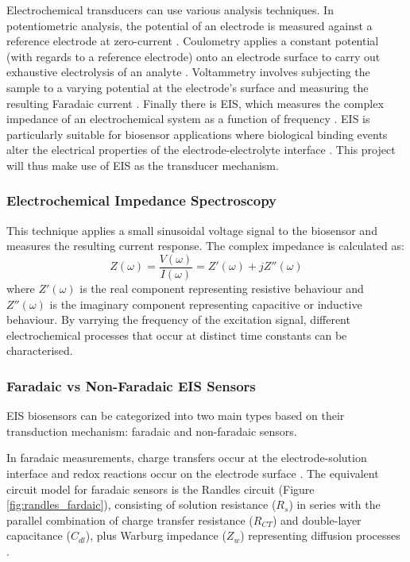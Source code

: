 Electrochemical transducers can use various analysis techniques. In potentiometric analysis, the potential of an electrode is measured against a reference electrode at zero-current \cite{magarElectrochemicalImpedanceSpectroscopy2021}. Coulometry applies a constant potential (with regards to a reference electrode) onto an electrode surface to carry out exhaustive electrolysis of an analyte \cite{magarElectrochemicalImpedanceSpectroscopy2021}. Voltammetry involves subjecting the sample to a varying potential at the electrode's surface and measuring the resulting Faradaic current \cite{magarElectrochemicalImpedanceSpectroscopy2021}. Finally there is \ac{EIS}, which measures the complex impedance of an electrochemical system as a function of frequency \cite{magarElectrochemicalImpedanceSpectroscopy2021}. EIS is particularly suitable for biosensor applications where biological binding events alter the electrical properties of the electrode-electrolyte interface \cite{danielsLabelFreeImpedanceBiosensors2007}. This project will thus make use of EIS as the transducer mechanism.

\subsubsection{Electrochemical Impedance Spectroscopy}
This technique applies a small sinusoidal voltage signal to the biosensor and measures the resulting current response. The complex impedance is calculated as:
\begin{equation}
    Z(\omega) = \frac{V(\omega)}{I(\omega)} = Z'(\omega) + jZ''(\omega)
\end{equation}
where $Z'(\omega)$ is the real component representing resistive behaviour and $Z''(\omega)$ is the imaginary component representing capacitive or inductive behaviour.\cite{orazemTutorialElectrochemicalImpedance2020} By varrying the frequency of the excitation signal, different electrochemical processes that occur at distinct time constants can be characterised. 

\subsubsection{Faradaic vs Non-Faradaic EIS Sensors}
EIS biosensors can be categorized into two main types based on their transduction mechanism: faradaic and non-faradaic sensors.

In faradaic measurements, charge transfers occur at the electrode-solution interface and redox reactions occur on the electrode surface \cite{xieReviewAdvancementsNanoscale2020a}. The equivalent circuit model for faradaic sensors is the Randles circuit (Figure \ref{fig:randles_fardaic}), consisting of solution resistance ($R_s$) in series with the parallel combination of charge transfer resistance ($R_{CT}$) and double-layer capacitance ($C_{dl}$), plus Warburg impedance ($Z_w$) representing diffusion processes \cite{xieReviewAdvancementsNanoscale2020a}.


